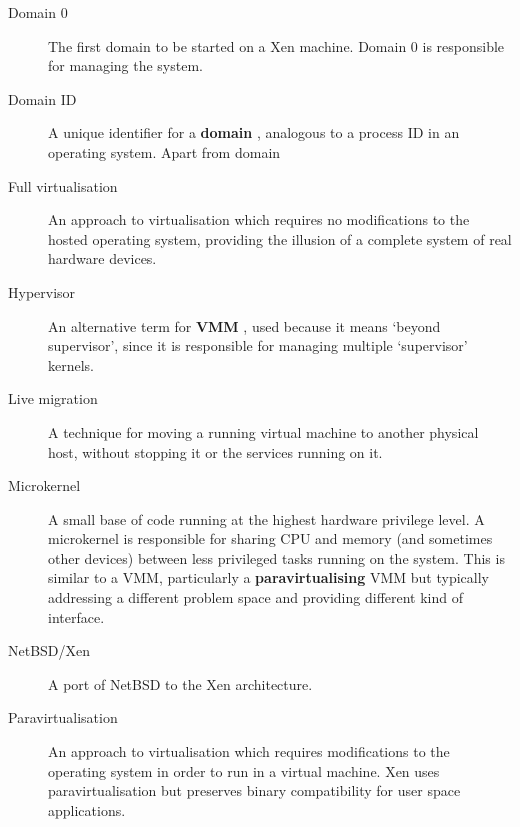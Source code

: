 \documentclass[11pt,twoside,final,openright]{xenstyle}
\begin{document}
{\begin{description}
\item[Domain 0]            The first domain to be started on a Xen
                           machine.  Domain 0 is responsible for managing
                           the system.

\item[Domain ID]           A unique identifier for a { \bf domain },
                           analogous to a process ID in an operating
                           system.  Apart from domain

\item[Full virtualisation] An approach to virtualisation which
                           requires no modifications to the hosted
                           operating system, providing the illusion of
                           a complete system of real hardware devices.

\item[Hypervisor]          An alternative term for { \bf VMM }, used
                           because it means `beyond supervisor',
                           since it is responsible for managing multiple
                           `supervisor' kernels.

\item[Live migration]      A technique for moving a running virtual
                           machine to another physical host, without
                           stopping it or the services running on it.

\item[Microkernel]         A small base of code running at the highest
                           hardware privilege level.  A microkernel is
                           responsible for sharing CPU and memory (and
                           sometimes other devices) between less
                           privileged tasks running on the system.
                           This is similar to a VMM, particularly a
                           {\bf paravirtualising} VMM but typically
                           addressing a different problem space and
                           providing different kind of interface.

\item[NetBSD/Xen]          A port of NetBSD to the Xen architecture.

\item[Paravirtualisation]  An approach to virtualisation which requires
                           modifications to the operating system in
                           order to run in a virtual machine.  Xen
                           uses paravirtualisation but preserves
                           binary compatibility for user space
                           applications.


\end{description}}
\end{document}
